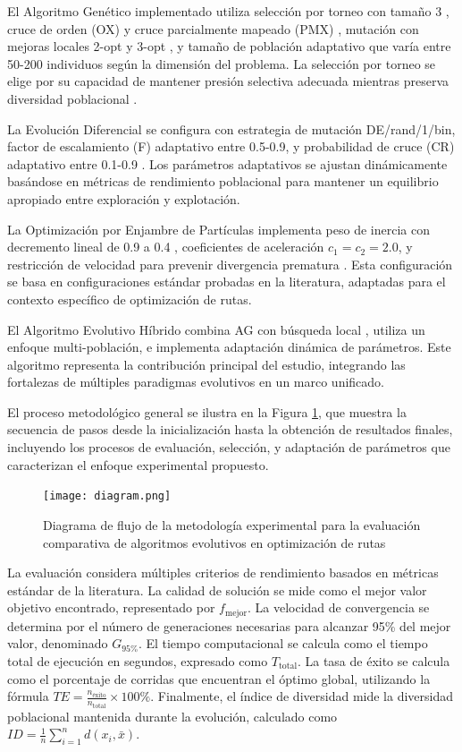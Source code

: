 \documentclass[10pt,a4paper]{article}
\begin{document}
El Algoritmo Genético implementado utiliza selección por torneo con tamaño 3 \cite{blickle1996}, cruce de orden (OX) y cruce parcialmente mapeado (PMX) \cite{syswerda1989}, mutación con mejoras locales 2-opt y 3-opt \cite{reynolds2007}, y tamaño de población adaptativo que varía entre 50-200 individuos según la dimensión del problema. La selección por torneo se elige por su capacidad de mantener presión selectiva adecuada mientras preserva diversidad poblacional \cite{eiben2003}.

La Evolución Diferencial se configura con estrategia de mutación DE/rand/1/bin, factor de escalamiento (F) adaptativo entre 0.5-0.9, y probabilidad de cruce (CR) adaptativo entre 0.1-0.9 \cite{das2011}. Los parámetros adaptativos se ajustan dinámicamente basándose en métricas de rendimiento poblacional para mantener un equilibrio apropiado entre exploración y explotación.

La Optimización por Enjambre de Partículas implementa peso de inercia con decremento lineal de 0.9 a 0.4 \cite{clerc2002}, coeficientes de aceleración $c_1=c_2=2.0$, y restricción de velocidad para prevenir divergencia prematura \cite{pedersen2010}. Esta configuración se basa en configuraciones estándar probadas en la literatura, adaptadas para el contexto específico de optimización de rutas.

El Algoritmo Evolutivo Híbrido combina AG con búsqueda local \cite{voudouris2003}, utiliza un enfoque multi-población, e implementa adaptación dinámica de parámetros. Este algoritmo representa la contribución principal del estudio, integrando las fortalezas de múltiples paradigmas evolutivos en un marco unificado.

El proceso metodológico general se ilustra en la Figura \ref{fig:methodology_flowchart}, que muestra la secuencia de pasos desde la inicialización hasta la obtención de resultados finales, incluyendo los procesos de evaluación, selección, y adaptación de parámetros que caracterizan el enfoque experimental propuesto.

\begin{figure}[H]
\centering
\texttt{[image: diagram.png]}
\caption{Diagrama de flujo de la metodología experimental para la evaluación comparativa de algoritmos evolutivos en optimización de rutas}
\label{fig:methodology_flowchart}
\end{figure}

La evaluación considera múltiples criterios de rendimiento basados en métricas estándar de la literatura. La calidad de solución se mide como el mejor valor objetivo encontrado, representado por $f_{\text{mejor}}$. La velocidad de convergencia se determina por el número de generaciones necesarias para alcanzar 95\% del mejor valor, denominado $G_{95\%}$. El tiempo computacional se calcula como el tiempo total de ejecución en segundos, expresado como $T_{\text{total}}$. La tasa de éxito se calcula como el porcentaje de corridas que encuentran el óptimo global, utilizando la fórmula $TE = \frac{n_{\text{éxito}}}{n_{\text{total}}} \times 100\%$. Finalmente, el índice de diversidad mide la diversidad poblacional mantenida durante la evolución, calculado como $ID = \frac{1}{n}\sum_{i=1}^{n}d(x_i, \bar{x})$.
\end{document}

